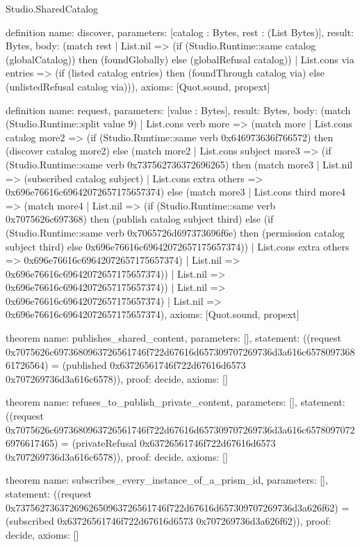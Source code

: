 \begin{lexlean}{Studio.SharedCatalog}
\begin{semanticmodule}
definition{
  name: discover,
  parameters: [catalog : Bytes, rest : (List Bytes)],
  result: Bytes,
  body: (match rest
    | List.nil => (if (Studio.Runtime::same catalog (globalCatalog)) then (foundGlobally) else (globalRefusal catalog))
    | List.cons via entries => (if (listed catalog entries) then (foundThrough catalog via) else (unlistedRefusal catalog via))),
  axioms: [Quot.sound, propext]
}

definition{
  name: request,
  parameters: [value : Bytes],
  result: Bytes,
  body: (match (Studio.Runtime::split value 9)
    | List.cons verb more => (match more
      | List.cons catalog more2 => (if (Studio.Runtime::same verb 0x646973636f766572) then (discover catalog more2) else (match more2
        | List.cons subject more3 => (if (Studio.Runtime::same verb 0x737562736372696265) then (match more3
          | List.nil => (subscribed catalog subject)
          | List.cons extra others => 0x696e76616c69642072657175657374) else (match more3
          | List.cons third more4 => (match more4
            | List.nil => (if (Studio.Runtime::same verb 0x7075626c697368) then (publish catalog subject third) else (if (Studio.Runtime::same verb 0x7065726d697373696f6e) then (permission catalog subject third) else 0x696e76616c69642072657175657374))
            | List.cons extra others => 0x696e76616c69642072657175657374)
          | List.nil => 0x696e76616c69642072657175657374))
        | List.nil => 0x696e76616c69642072657175657374))
      | List.nil => 0x696e76616c69642072657175657374)
    | List.nil => 0x696e76616c69642072657175657374),
  axioms: [Quot.sound, propext]
}

theorem{
  name: publishes_shared_content,
  parameters: [],
  statement: ((request 0x7075626c6973680963726561746f722d67616d657309707269736d3a616c657809736861726564) = (published 0x63726561746f722d67616d6573 0x707269736d3a616c6578)),
  proof: decide{},
  axioms: []
}

theorem{
  name: refuses_to_publish_private_content,
  parameters: [],
  statement: ((request 0x7075626c6973680963726561746f722d67616d657309707269736d3a616c65780970726976617465) = (privateRefusal 0x63726561746f722d67616d6573 0x707269736d3a616c6578)),
  proof: decide{},
  axioms: []
}

theorem{
  name: subscribes_every_instance_of_a_prism_id,
  parameters: [],
  statement: ((request 0x7375627363726962650963726561746f722d67616d657309707269736d3a626f62) = (subscribed 0x63726561746f722d67616d6573 0x707269736d3a626f62)),
  proof: decide{},
  axioms: []
}


\end{semanticmodule}
\end{lexlean}
